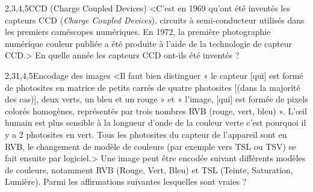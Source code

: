 \begin{quiz}[title={Photographie numérique}]
\vspace{-\baselineskip}
\begin{quizquestion*}[b]{1}{2,3,4,5}{CCD ({\upshape Charge Coupled Devices})}
<C'est en 1969 qu'ont été inventés les capteurs CCD (\textit{Charge Coupled Devices}), circuits à semi-conducteur utilisés dans les premiers caméscopes numériques. En 1972, la première photographie numérique couleur publiée a été produite à l'aide de la technologie de capteur CCD.>
En quelle année les capteurs CCD ont-ils été inventés ?
\end{quizquestion*}

\begin{quizquestion}[b]{2,3}{1,4,5}{Encodage des images}
<Il faut bien distinguer « le capteur [qui] est formé de photosites en matrice de petits carrés de quatre photosites [(dans la majorité des cas)], deux verts, un bleu et un rouge » et « l’image, [qui] est formée de pixels colorés homogènes, représentés par trois nombres RVB (rouge, vert, bleu) ».
L’œil humain est plus sensible à la longueur d'onde de la couleur verte c'est pourquoi il y a 2 photosites en vert.
Tous les photosites du capteur de l'appareil sont en RVB, le changement de modèle de couleurs (par exemple vers TSL ou TSV) se fait ensuite par logiciel.>
Une image peut être encodée suivant différents modèles de couleurs, notamment RVB (Rouge, Vert, Bleu) et TSL (Teinte, Saturation, Lumière). Parmi les affirmations suivantes lesquelles sont vraies ?
\end{quizquestion}


\end{quiz}
